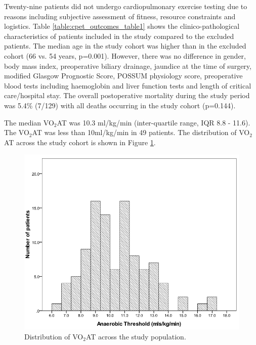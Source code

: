 Twenty-nine patients did not undergo cardiopulmonary exercise testing due to reasons including subjective assessment of fitness, resource constraints and logistics. 
Table \ref{table:cpet_outcomes_table1} shows the clinico-pathological characteristics of patients included in the study compared to the excluded patients. 
The median age in the study cohort was higher than in the excluded cohort (66 vs. 54 years, p=0.001). 
However, there was no difference in gender, body mass index, preoperative biliary drainage, jaundice at the time of surgery, modified Glasgow Prognostic Score, POSSUM physiology score, preoperative blood tests including haemoglobin and liver function tests and length of critical care/hospital stay. 
The overall postoperative mortality during the study period was 5.4\% (7/129) with all deaths occurring in the study cohort (p=0.144).



The median VO$_2$AT was 10.3 ml/kg/min (inter-quartile range, IQR 8.8 - 11.6). 
The VO$_2$AT was less than 10ml/kg/min in 49 patients. 
The distribution of VO$_2$AT across the study cohort is shown in Figure \ref{fig:cpet_outcomes_dist_of_AT}.

\begin{figure}[htbp]
	\centering
	\includegraphics[width=0.8\linewidth]{Figures/cpet_outcomes_dist_of_AT}
	\caption{Distribution of VO$_2$AT across the study population.}
	\label{fig:cpet_outcomes_dist_of_AT}
\end{figure}

